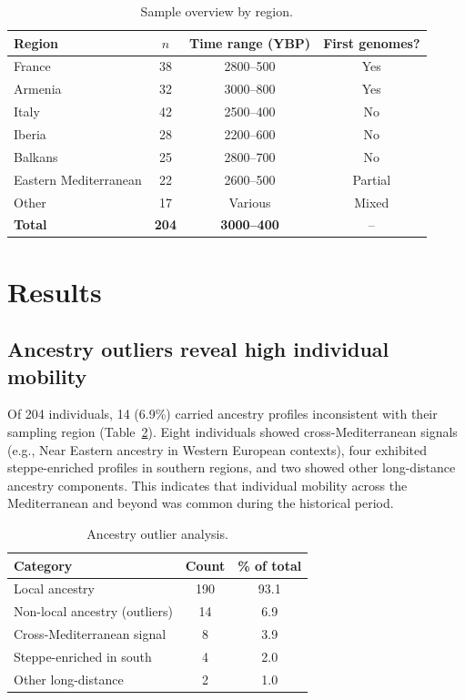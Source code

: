 \documentclass[11pt]{article}
\begin{document}
\begin{table}[h]
\centering
\caption{Sample overview by region.}
\label{tab:samples}
\begin{tabular}{lccc}
\toprule
Region & $n$ & Time range (YBP) & First genomes? \\
\midrule
France & 38 & 2800--500 & Yes \\
Armenia & 32 & 3000--800 & Yes \\
Italy & 42 & 2500--400 & No \\
Iberia & 28 & 2200--600 & No \\
Balkans & 25 & 2800--700 & No \\
Eastern Mediterranean & 22 & 2600--500 & Partial \\
Other & 17 & Various & Mixed \\
\textbf{Total} & \textbf{204} & \textbf{3000--400} & -- \\
\bottomrule
\end{tabular}
\end{table}

\section{Results}

\subsection{Ancestry outliers reveal high individual mobility}
Of 204 individuals, 14 (6.9\%) carried ancestry profiles inconsistent with their sampling region (Table~\ref{tab:outliers}). Eight individuals showed cross-Mediterranean signals (e.g., Near Eastern ancestry in Western European contexts), four exhibited steppe-enriched profiles in southern regions, and two showed other long-distance ancestry components. This indicates that individual mobility across the Mediterranean and beyond was common during the historical period.

\begin{table}[h]
\centering
\caption{Ancestry outlier analysis.}
\label{tab:outliers}
\begin{tabular}{lcc}
\toprule
Category & Count & \% of total \\
\midrule
Local ancestry & 190 & 93.1 \\
Non-local ancestry (outliers) & 14 & 6.9 \\
\quad Cross-Mediterranean signal & 8 & 3.9 \\
\quad Steppe-enriched in south & 4 & 2.0 \\
\quad Other long-distance & 2 & 1.0 \\
\bottomrule
\end{tabular}
\end{table}
\end{document}
